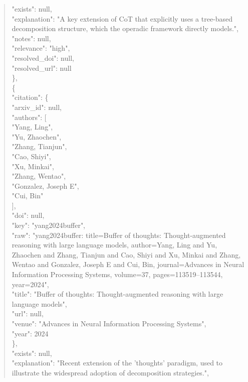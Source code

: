 \documentclass[11pt]{article}
\begin{document}
\begin{quote}
      "exists": null,\\
      "explanation": "A key extension of CoT that explicitly uses a tree-based decomposition structure, which the operadic framework directly models.",\\
      "notes": null,\\
      "relevance": "high",\\
      "resolved\_doi": null,\\
      "resolved\_url": null\\
    \},\\
    \{\\
      "citation": \{\\
        "arxiv\_id": null,\\
        "authors": [\\
          "Yang, Ling",\\
          "Yu, Zhaochen",\\
          "Zhang, Tianjun",\\
          "Cao, Shiyi",\\
          "Xu, Minkai",\\
          "Zhang, Wentao",\\
          "Gonzalez, Joseph E",\\
          "Cui, Bin"\\
        ],\\
        "doi": null,\\
        "key": "yang2024buffer",\\
        "raw": "yang2024buffer: title=Buffer of thoughts: Thought-augmented reasoning with large language models, author=Yang, Ling and Yu, Zhaochen and Zhang, Tianjun and Cao, Shiyi and Xu, Minkai and Zhang, Wentao and Gonzalez, Joseph E and Cui, Bin, journal=Advances in Neural Information Processing Systems, volume=37, pages=113519--113544, year=2024",\\
        "title": "Buffer of thoughts: Thought-augmented reasoning with large language models",\\
        "url": null,\\
        "venue": "Advances in Neural Information Processing Systems",\\
        "year": 2024\\
      \},\\
      "exists": null,\\
      "explanation": "Recent extension of the 'thoughts' paradigm, used to illustrate the widespread adoption of decomposition strategies.",\\

\end{quote}
\end{document}
